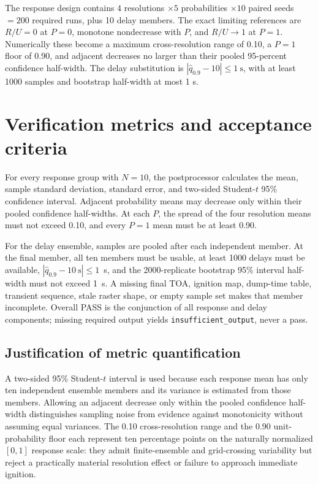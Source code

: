 The response design contains
\(4\) resolutions \(\times5\) probabilities \(\times10\) paired seeds
\(=200\) required runs, plus 10 delay members.  The exact limiting references
are \(R/U=0\) at \(P=0\), monotone nondecrease with \(P\), and \(R/U\to1\)
at \(P=1\).  Numerically these become a maximum cross-resolution range of
0.10, a \(P=1\) floor of 0.90, and adjacent decreases no larger than their
pooled 95-percent confidence half-width.  The delay substitution is
\(|\widehat q_{0.9}-10|\leq1~\mathrm{s}\), with at least 1000 samples and
bootstrap half-width at most 1 s.

\section{Verification metrics and acceptance criteria}
For every response group with $N=10$, the postprocessor calculates the mean,
sample standard deviation, standard error, and two-sided Student-$t$ 95\%
confidence interval. Adjacent probability means may decrease only within their
pooled confidence half-widths. At each $P$, the spread of the four resolution
means must not exceed 0.10, and every $P=1$ mean must be at least 0.90.

For the delay ensemble, samples are pooled after each independent member. At the
final member, all ten members must be usable, at least 1000 delays must be
available, $|\widehat q_{0.9}-10~\mathrm{s}|\le1$~s, and the 2000-replicate
bootstrap 95\% interval half-width must not exceed 1~s. A missing final TOA,
ignition map, dump-time table, transient sequence, stale raster shape, or empty
sample set makes that member incomplete. Overall PASS is the conjunction of all
response and delay components; missing required output yields
\texttt{insufficient\_output}, never a pass.

\subsection{Justification of metric quantification}

A two-sided 95\% Student-\(t\) interval is used because each response mean has
only ten independent ensemble members and its variance is estimated from those
members.  Allowing an adjacent decrease only within the pooled confidence
half-width distinguishes sampling noise from evidence against monotonicity
without assuming equal variances.  The 0.10 cross-resolution range and the
0.90 unit-probability floor each represent ten percentage points on the
naturally normalized \([0,1]\) response scale: they admit finite-ensemble and
grid-crossing variability but reject a practically material resolution effect
or failure to approach immediate ignition.


